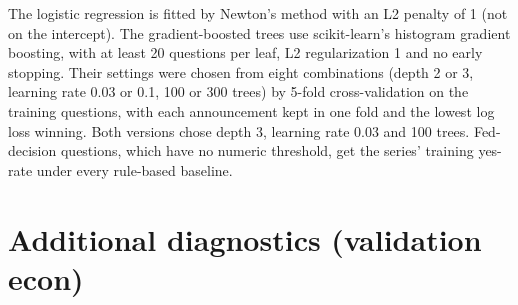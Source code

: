 \documentclass[11pt]{article}
\begin{document}
The logistic regression is fitted by Newton's method with an L2 penalty of 1 (not on the intercept). The gradient-boosted trees use scikit-learn's histogram gradient boosting, with at least 20 questions per leaf, L2 regularization 1 and no early stopping. Their settings were chosen from eight combinations (depth 2 or 3, learning rate 0.03 or 0.1, 100 or 300 trees) by 5-fold cross-validation on the training questions, with each announcement kept in one fold and the lowest log loss winning. Both versions chose depth 3, learning rate 0.03 and 100 trees. Fed-decision questions, which have no numeric threshold, get the series' training yes-rate under every rule-based baseline.

\section{Additional diagnostics (validation econ)}
\label{app:diag}
\end{document}

